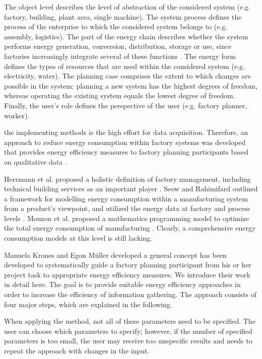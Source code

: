 The object level describes the level of abstraction of the considered system (e.g. factory, building, plant area, single machine). The system process defines the process of the enterprise to which the considered system belongs to (e.g. assembly, logistics). The part of the energy chain describes whether the system performs energy generation, conversion, distribution, storage or use, since factories increasingly integrate several of these functions \cite{Muller2013a}. The energy form defines the types of resources that are used within the considered system (e.g. electricity, water). The planning case comprises the extent to which changes are possible in the system; planning a new system has the highest degrees of freedom, whereas operating the existing system equals the lowest degree of freedom. Finally, the user's role defines the perspective of the user (e.g. factory planner, worker). 

the implementing methods is the high effort for data acquisition. Therefore, an approach to reduce energy consumption within factory systems was developed that provides energy efficiency measures to factory planning participants based on qualitative data \cite{Muller2013}.

Herrmann et al.\cite{Herrmann2011} proposed a holistic definition of factory management, including technical building services as an important player \cite{Herrmann2011}. Seow and Rahimifard outlined a framework for modelling energy consumption within a manufacturing system from a product’s viewpoint, and utilized the energy data at factory and process levels \cite{Seow2011}. Mouzon et al. proposed a mathematics programming model to optimize the total energy consumption of manufacturing \cite{Gilles2007}. Clearly, a comprehensive energy consumption models at this level is still lacking. 

Manuela Krones and Egon Müller \cite{Krones2014} developed a general concept has been developed to systematically guide a factory planning participant from his or her project task to appropriate energy efficiency measures. We introduce their work in detail here. The goal is to provide suitable energy efficiency approaches in order to increase the efficiency of information gathering. The approach consists of four major steps, which are explained in the following.


When applying the method, not all of these parameters need to be specified. The user can choose which parameters to specify; however, if the number of specified parameters is too small, the user may receive too unspecific results and needs to repeat the approach with changes in the input. 

